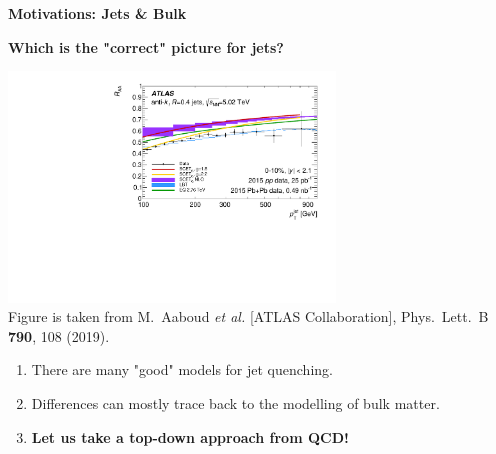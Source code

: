 \documentclass[9pt,a4paper,unknownkeysallowed,xcolor=dvipsnames,aspectratio=43]{beamer}
\begin{document}
{
\begin{frame}
%
\vspace{4mm}
\titlepage
\end{frame}
}
%
%
\setcounter{page}{0}
\begin{frame}
\vspace*{\fill}
\begin{center}
{\Huge\bf\color{gray} Motivations: Jets \& Bulk}
\end{center}
\vspace*{\fill}
\end{frame}
%
%
\begin{frame}{\bf\huge Which is the "correct" picture for jets?}	\vspace{4mm}
\begin{center}
\includegraphics[width=0.65\textwidth]{fig/RAA_jet}\\
{\tiny  Figure is taken from {\color{teablue}
M.~Aaboud {\it et al.} [ATLAS Collaboration],
  Phys.\ Lett.\ B {\bf 790}, 108 (2019).
  }}
\end{center}
\vspace{2mm}
\begin{enumerate}
\item{\large There are many "good" models for jet quenching.}
\vspace{4mm}
\item{\large Differences can mostly trace back to the modelling of  bulk matter.}
\vspace{4mm}
\item{\large\bf\color{darkred} Let us take a top-down approach from QCD!}
\end{enumerate}
\end{frame}
\end{document}
